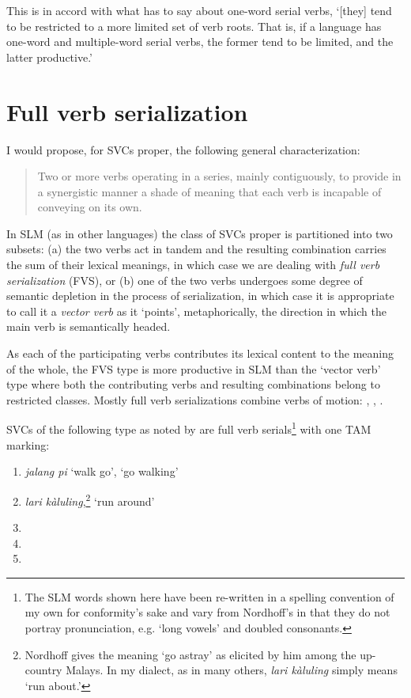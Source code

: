 This is in accord with what \citet[51]{Aikhenvald2006} has to say about one-word serial verbs, `[they] tend to be restricted to a more limited set of verb roots. That is, if a language has one-word and multiple-word serial verbs, the former tend to be limited, and the latter productive.'

\section{Full verb serialization}%

I would propose, for SVCs proper, the following general characterization:

\begin{quote} 
Two or more verbs operating in a series, mainly contiguously, to provide in a synergistic manner a shade of meaning that each verb is incapable of conveying on its own.
\end{quote}
 

In SLM (as in other languages) the class of SVCs proper is partitioned into two subsets: (a) the two verbs act in tandem and the resulting combination carries the sum of their lexical meanings, in which case we are dealing with {\em full verb serialization} (FVS), or (b) one of the two verbs undergoes some degree of semantic depletion in the process of serialization, in which case it is appropriate to call it a {\em vector verb} as it `points', metaphorically, the direction in which the main verb is semantically headed. 


As each of the participating verbs contributes its lexical content to the meaning of the whole, the FVS type is more productive in SLM than the `vector verb' type where both the contributing verbs and resulting combinations belong to restricted classes. Mostly full verb serializations combine verbs of motion: 
, 
, 
.

SVCs of the following type as noted by \citet{Nordhoff2009} are full verb serials\footnote{The
 SLM words shown here have been re-written in a spelling convention of my own for conformity's sake and vary from Nordhoff's in that they do not portray pronunciation, e.g. `long vowels' and doubled consonants.
} 
with one TAM marking:

\begin{enumerate}
\item  \textit{jalang pi} `walk go', `go walking'
\item  \textit{lari kàluling},\footnote{Nordhoff
 gives the meaning `go astray' as elicited by him among the up-country Malays. In my dialect, as in many others, \textit{lari kàluling} simply means `run about.'
} `run around'
\item {}
\item  {}
\item  {}
\end{enumerate}

